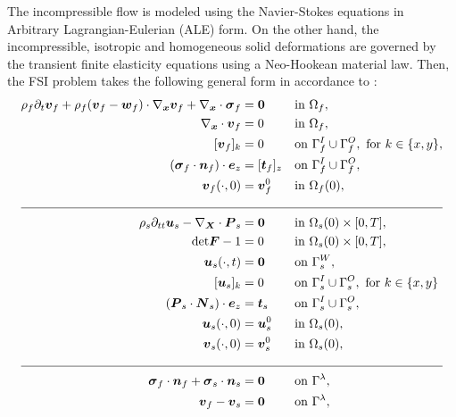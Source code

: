\documentclass[3p]{elsarticle}
\begin{document}
The incompressible flow is modeled using the Navier-Stokes equations in Arbitrary Lagrangian-Eulerian (ALE) form.
On the other hand, the incompressible, isotropic and homogeneous solid deformations are governed
by the transient finite elasticity equations using a Neo-Hookean material law.
Then, the FSI problem takes the following general form in accordance to \cite{HessenthalerBalmusRoehrleNordsletten2020}:
\begin{align}
                \rho_f \partial_t \boldsymbol{v}_f +  \rho_f (\boldsymbol{v}_f - \boldsymbol{w}_f) \cdot \nabla_{\boldsymbol{x}}
     \boldsymbol{v}_f
    +\nabla_{\boldsymbol{x}} \cdot \boldsymbol{\sigma}_f &= \boldsymbol{0} && \text{in } \Omega_f,
    \label{eq:strong_form_nonlinear_fluid_momentum_balance}
    \\
    \nabla_{\boldsymbol{x}} \cdot \boldsymbol{v}_f &= 0 && \text{in } \Omega_f,
    \\
    [\boldsymbol{v}_f]_k & = 0 && \text{on } \Gamma_f^I \cup \Gamma_f^O,~\text{for } k\in\{ x, y \},
    \\
    (\boldsymbol{\sigma}_f \cdot \boldsymbol{n}_f ) \cdot \boldsymbol{e}_z
    & = [\boldsymbol{t}_f]_z && \text{on } \Gamma_f^I \cup \Gamma_f^O,
    \\
    \boldsymbol{v}_f (\cdot, 0) &= \boldsymbol{v}_f^0 && \text{in } \Omega_f (0),
    \\
        \cline{1-4}
                    \rho_s \partial_{tt} \boldsymbol{u}_s -\nabla_{\boldsymbol{X}}
    \cdot \boldsymbol{P}_s &= \boldsymbol{0} && \text{in } \Omega_s(0)\times[0,T],
    \label{eq:strong_form_nonlinear_solid_momentum_balance}
    \\
    \text{det}\boldsymbol{F} - 1 &= 0 && \text{in } \Omega_s(0) \times [0,T],
    \\
    \boldsymbol{u}_s (\cdot, t) &= \boldsymbol{0} && \text{on } \Gamma_s^W,
    \\
    [\boldsymbol{u}_s]_k & = 0 && \text{on }
    \Gamma_s^I \cup \Gamma_s^O,~\text{for } k\in \{ x, y \}
    \\
    (\boldsymbol{P}_s \cdot \boldsymbol{N}_s) \cdot \boldsymbol{e}_z
    &= \boldsymbol{t}_s && \text{on }
    \Gamma_s^I \cup \Gamma_s^O,
    \\
    \boldsymbol{u}_s (\cdot, 0) &= \boldsymbol{u}_s^0 && \text{in } \Omega_s (0),
    \\
    \boldsymbol{v}_s (\cdot, 0) & = \boldsymbol{v}_s^0 && \text{in } \Omega_s (0),
    \\
        \cline{1-4}
                    \boldsymbol{\sigma}_f \cdot \boldsymbol{n}_f + \boldsymbol{\sigma}_s \cdot \boldsymbol{n}_s &= \boldsymbol{0} && \text{on } \Gamma^\lambda, \label{eq:strong_form_nonlinear_dynamic_constraint}\\
    \boldsymbol{v}_f - \boldsymbol{v}_s &= \boldsymbol{0} && \text{on } \Gamma^\lambda,
    \label{eq:strong_form_nonlinear_kinematic_constraint}
\end{align}
\end{document}
